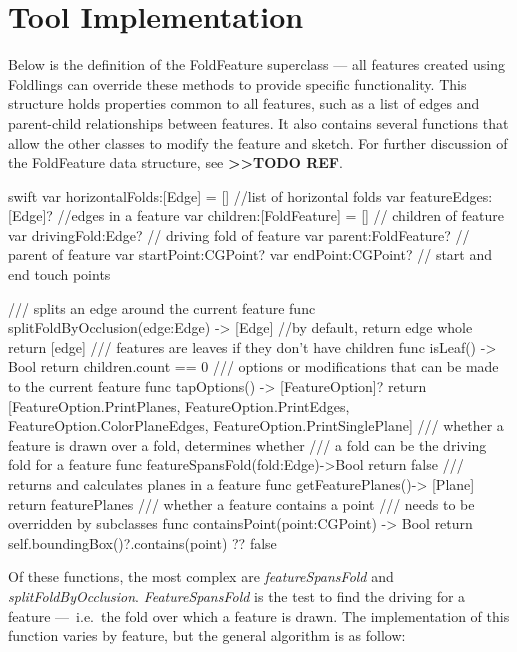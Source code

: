 \section{Tool Implementation}\label{tool-implementation}

Below is the definition of the FoldFeature superclass --- all features
created using Foldlings can override these methods to provide specific
functionality. This structure holds properties common to all features,
such as a list of edges and parent-child relationships between features.
It also contains several functions that allow the other classes to
modify the feature and sketch. For further discussion of the FoldFeature
data structure, see \textbf{\textgreater{}\textgreater{}TODO REF}.

\small
\singlespacing 

\begin{pygmented}{swift}
var horizontalFolds:[Edge] = [] //list of horizontal folds
var featureEdges:[Edge]?        //edges in a feature
var children:[FoldFeature] = [] // children of feature
var drivingFold:Edge? // driving fold of feature
var parent:FoldFeature? // parent of feature
var startPoint:CGPoint?
var endPoint:CGPoint? // start and end touch points

/// splits an edge around the current feature
func splitFoldByOcclusion(edge:Edge) -> [Edge]
{
//by default, return edge whole
return [edge]
}
/// features are leaves if they don't have children
func isLeaf() -> Bool
{
return children.count == 0
}
/// options or modifications that can be made to the current feature
func tapOptions() -> [FeatureOption]?
{
  return [FeatureOption.PrintPlanes, FeatureOption.PrintEdges,
  FeatureOption.ColorPlaneEdges, FeatureOption.PrintSinglePlane]
}
/// whether a feature is drawn over a fold, determines whether 
/// a fold can be the driving fold for a feature
  func featureSpansFold(fold:Edge)->Bool
{
  return false
}
/// returns and calculates planes in a feature
func getFeaturePlanes()-> [Plane]{
  return featurePlanes
}
/// whether a feature contains a point
/// needs to be overridden by subclasses
func containsPoint(point:CGPoint) -> Bool{
  return self.boundingBox()?.contains(point) ?? false
}
\end{pygmented}

\doublespacing
\normalsize

Of these functions, the most complex are \emph{featureSpansFold} and
\emph{splitFoldByOcclusion}. \emph{FeatureSpansFold} is the test to find
the driving for a feature ---~i.e.~the fold over which a feature is
drawn. The implementation of this function varies by feature, but the
general algorithm is as follow:

